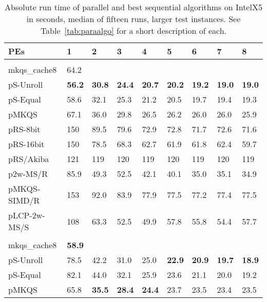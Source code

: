 \documentclass[a4paper]{myjournal}
\begin{document}
\begin{table}\centering\small
\caption{Absolute run time of parallel and best sequential algorithms on IntelX5 in seconds, median of fifteen runs, larger test instances. See Table~\ref{tab:paraalgo} for a short description of each.}\label{tab:absrun-IntelX5}
\begin{tabularx}{\linewidth}{l|*{8}{>{\hfill}X}|@{}}
PEs          & 1   & 2 & 3 & 4 & 5 & 6 & 7 & 8                                                                                      \\ \hline
& \multicolumn{8}{l|}{\textbf{URLs}, , , } \\ \cline{2-9}
mkqs\_cache8 & 64.2 &  &  &  &  &  &  &  \\
pS-Unroll & \bf 56.2 & \bf 30.8 & \bf 24.4 & \bf 20.7 & \bf 20.2 & \bf 19.2 & \bf 19.0 & \bf 19.0 \\
 pS-Equal &     58.6 &     32.1 &     25.3 &     21.2 &     20.5 &     19.7 &     19.4 &     19.3 \\
        pMKQS &     67.1 &     36.0 &     29.8 &     26.5 &     26.2 &     26.0 &     26.0 &     25.9 \\
     pRS-8bit &      150 &     89.5 &     79.6 &     72.9 &     72.8 &     71.7 &     72.6 &     71.6 \\
    pRS-16bit &      150 &     78.5 &     68.3 &     62.7 &     61.9 &     61.8 &     62.4 &     59.7 \\
    pRS/Akiba &      121 &      119 &      120 &      119 &      120 &      119 &      120 &      119 \\
     p2w-MS/R &     85.9 &     49.3 &     52.5 &     42.1 &     40.1 &     35.0 &     35.1 &     34.9 \\
 pMKQS-SIMD/R &      153 &     92.0 &     83.9 &     77.9 &     77.5 &     77.2 &     77.4 &     77.5 \\
 pLCP-2w-MS/S &      108 &     63.3 &     52.5 &     49.9 &     57.8 &     55.8 &     54.4 &     57.7 \\ \hline
& \multicolumn{8}{l|}{\textbf{Random}, , , } \\ \cline{2-9}
mkqs\_cache8 & \bf 58.9 &  &  &  &  &  &  &  \\
pS-Unroll & 78.5 &     42.2 &     31.0 &     25.0 & \bf 22.9 & \bf 20.9 & \bf 19.7 & \bf 18.9 \\
 pS-Equal & 82.1 &     44.0 &     32.1 &     25.9 &     23.6 &     21.1 &     20.0 &     19.2 \\
        pMKQS & 65.8 & \bf 35.5 & \bf 28.4 & \bf 24.4 &     23.7 &     23.5 &     23.4 &     23.5 \\

\end{tabularx}
\end{table}
\end{document}
